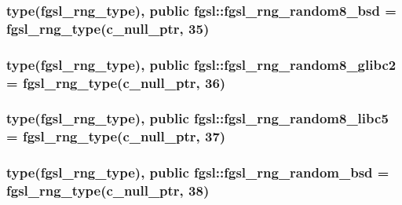 \hypertarget{classfgsl_a03a999d95485529c23b1eeb38284dd6a}{
\subsubsection[{fgsl\-\_\-rng\-\_\-random8\-\_\-bsd}]{\setlength{\rightskip}{0pt plus 5cm}type({\bf fgsl\-\_\-rng\-\_\-type}), public fgsl\-::fgsl\-\_\-rng\-\_\-random8\-\_\-bsd = {\bf fgsl\-\_\-rng\-\_\-type}(c\-\_\-null\-\_\-ptr, 35)}}\label{classfgsl_a03a999d95485529c23b1eeb38284dd6a}
\hypertarget{classfgsl_a6028caefc0e3a940d1ee57801f7fd438}{
\subsubsection[{fgsl\-\_\-rng\-\_\-random8\-\_\-glibc2}]{\setlength{\rightskip}{0pt plus 5cm}type({\bf fgsl\-\_\-rng\-\_\-type}), public fgsl\-::fgsl\-\_\-rng\-\_\-random8\-\_\-glibc2 = {\bf fgsl\-\_\-rng\-\_\-type}(c\-\_\-null\-\_\-ptr, 36)}}\label{classfgsl_a6028caefc0e3a940d1ee57801f7fd438}
\hypertarget{classfgsl_a2cce36d84f84109ec9e54bd0d252bbb3}{
\subsubsection[{fgsl\-\_\-rng\-\_\-random8\-\_\-libc5}]{\setlength{\rightskip}{0pt plus 5cm}type({\bf fgsl\-\_\-rng\-\_\-type}), public fgsl\-::fgsl\-\_\-rng\-\_\-random8\-\_\-libc5 = {\bf fgsl\-\_\-rng\-\_\-type}(c\-\_\-null\-\_\-ptr, 37)}}\label{classfgsl_a2cce36d84f84109ec9e54bd0d252bbb3}
\hypertarget{classfgsl_a087022fa0d8a304cfb59e544a14d0a3c}{
\subsubsection[{fgsl\-\_\-rng\-\_\-random\-\_\-bsd}]{\setlength{\rightskip}{0pt plus 5cm}type({\bf fgsl\-\_\-rng\-\_\-type}), public fgsl\-::fgsl\-\_\-rng\-\_\-random\-\_\-bsd = {\bf fgsl\-\_\-rng\-\_\-type}(c\-\_\-null\-\_\-ptr, 38)}}\label{classfgsl_a087022fa0d8a304cfb59e544a14d0a3c}
